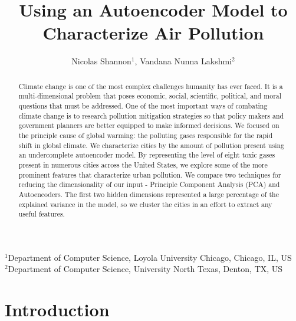 \documentclass{article}
\title{Using an Autoencoder Model to Characterize Air Pollution}
\author{Nicolas Shannon$^{1}$, Vandana Nunna Lakshmi$^{2}$}
\date{}
\begin{document}
\setlength{\parindent}{3ex}
\setlength{\parskip}{0.25ex}

\begin{centering}
\maketitle
\vspace{-0.50cm}
\scriptsize
{$^{1}$Department of Computer Science, Loyola University Chicago, Chicago, IL, US}\\
{$^{2}$Department of Computer Science, University North Texas, Denton, TX, US}\\
\end{centering}

\begin{abstract}
Climate change is one of the most complex challenges humanity has ever faced. It is a
multi-dimensional problem that poses economic, social, scientific, political, and 
moral questions that must be addressed. One of the most important ways of 
combating climate change is to research pollution mitigation strategies 
so that policy makers and government planners are better equipped to  make 
informed decisions. We focused on the principle cause of global warming:
the polluting gases responsible for the rapid shift in global climate.
We characterize cities by the amount of pollution present using an undercomplete autoencoder
model. By representing the level of eight toxic gases present in numerous cities
across the United States, we explore some of the more prominent features 
that characterize urban pollution. We compare two techniques for reducing 
the dimensionality of our input - Principle Component Analysis (PCA) and
Autoencoders. The first two hidden dimensions represented
a large percentage of the explained variance in the model, so we cluster
the cities in an effort to extract any useful features. 
\end{abstract}

\vspace{0.25cm}
\section{Introduction}
\end{document}
